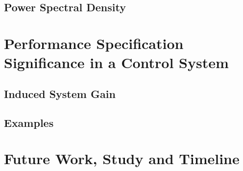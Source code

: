 \documentclass[a4paper,12pt]{article}
\begin{document}
	\subsection{Power Spectral Density}
\section{Performance Specification Significance in a Control System}
	\subsection{Induced System Gain}
	\subsection{Examples}
\section{Future Work, Study and Timeline}
\end{document}
